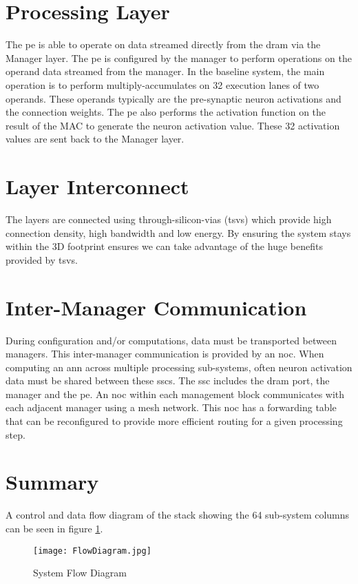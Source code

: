 \section{Processing Layer}
\label{sec:Processing Layer}
The \ac{pe} is able to operate on data streamed directly from the \ac{dram} via the Manager layer. 
The \ac{pe} is configured by the manager to perform operations on the operand data streamed from the manager. 
In the baseline system, the main operation is to perform multiply-accumulates on 32 execution lanes of two operands. 
These operands typically are the pre-synaptic neuron activations and the connection weights. 
The \ac{pe} also performs the activation function on the result of the MAC to generate the neuron activation value. 
These 32 activation values are sent back to the Manager layer.

\section{Layer Interconnect}
\label{sec:Layer Interconnect}

The layers are connected using through-silicon-vias (\ac{tsv}s) which provide high connection density, high bandwidth and low energy.
By ensuring the system stays within the 3D footprint ensures we can take advantage of the huge benefits provided by \ac{tsv}s.

\section{Inter-Manager Communication}
\label{sec:Inter-Manager Communication}

During configuration and/or computations, data must be transported between managers. This inter-manager communication is provided by an \ac{noc}.
When computing an \ac{ann} across multiple processing sub-systems, often neuron activation data must be shared between these \ac{ssc}s. The \ac{ssc} includes the \ac{dram} port, the manager and the \ac{pe}. 
An \ac{noc} within each management block communicates with each adjacent manager using a mesh network. This \ac{noc} has a forwarding table that can be reconfigured to provide more efficient routing for a given processing step.

\section{Summary}
\label{sec:Overview Summary}

A control and data flow diagram of the stack showing the 64 sub-system columns can be seen in figure \ref{fig:FlowDiagram}.
\begin{figure}[!t]
\centering
\captionsetup{justification=centering}
\centerline{
\mbox{\texttt{[image: FlowDiagram.jpg]}}
}
\caption{System Flow Diagram}
\label{fig:FlowDiagram}
\end{figure}

